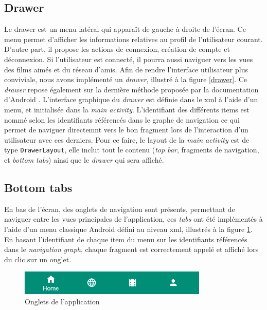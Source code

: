 \subsection{Drawer}
Le drawer est un menu latéral qui apparaît de gauche à droite de l'écran. Ce menu permet d'afficher les informations relatives au profil de l'utilisateur courant. D'autre part, il propose les actions de connexion, création de compte et déconnexion. Si l'utilisateur est connecté, il pourra aussi naviguer vers les vues des films aimés et du réseau d'amis.
Afin de rendre l'interface utilisateur plus conviviale, nous avons implémenté un \textit{drawer}, illustré à la figure \ref{drawer}. Ce \textit{drawer} repose également sur la dernière méthode proposée par la documentation d'Android \cite{docandroid}. L'interface graphique du \textit{drawer} est définie dans le \acrshort{xml} à l'aide d'un menu, et initialisée dans la \textit{main activity}. L'identifiant des différents items est nommé selon les identifiants référencés dans le graphe de navigation ce qui permet de naviguer directemnt vers le bon fragment lors de l'interaction d'un utilisateur avec ces derniers. Pour ce faire, le layout de la \textit{main activity} est de type \texttt{DrawerLayout}, elle inclut tout le contenu (\textit{top bar}, fragments de navigation, et \textit{bottom tabs}) ainsi que le \textit{drawer} qui sera affiché.

\subsection{Bottom tabs}
En bas de l'écran, des onglets de navigation sont présents, permettant de naviguer entre les vues principales de l'application, ces \textit{tabs} ont été implémentés à l'aide d'un menu classique Android défini au niveau \acrshort{xml}, illustrés à la figure \ref{tabs}. En basant l'identifiant de chaque item du menu sur les identifiants référencés dans le \textit{navigation graph}, chaque fragment est correctement appelé et affiché lors du clic sur un onglet.

\begin{figure}
    \begin{center}
        \includegraphics[width=0.8\textwidth]{img/screenshots/Bottom_Tabs.png}
    \end{center}
    \caption{Onglets de l'application}
    \label{tabs}
\end{figure}

